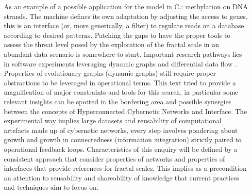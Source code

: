 \documentclass[14pt]{extarticle}
\begin{document}
As an example of a possible application for the model in C.: methylation on DNA strands. The machine defines its own adaptation by adjusting the access to genes, this is an interface (or, more generically, a filter) to regulate reads on a database according to desired patterns.
\newline
Patching the gaps to have the proper tools to assess the threat level posed by the exploration of the fractal scale in an abundant data scenario is somewhere to start. Important research pathways lies in software experiments leveraging dynamic graphs \cite{CS166dyngraphs} and differential data flow \cite{ABADIdiffdataflow}. Properties of evolutionary graphs (dynamic graphs) still require proper abstractions to be leveraged in operational terms. This text tried to provide a magnification of major constraints and tools for this search, in particular some relevant insights can be spotted in the bordering area and possible synergies between the concepts of Hyperconnected Cybernetic Networks and Interface. The experimental way implies large datasets and reusability of computational artefacts made up of cybernetic networks, every step involves pondering about growth and growth in connectedness (information integration) strictly paired to operational feedback loops. Characteristics of this enquiry will be defined by a consistent approach that consider properties of networks and properties of interfaces that provide references for fractal scales. This implies as a precondition an attention to reusability and shareability of knowledge that current practices and techniques aim to focus on.

\newpage

\end{document}
